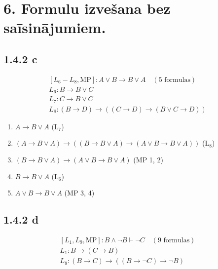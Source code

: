 \documentclass{article}
\begin{document}
\pagebreak
\section*{6. Formulu izvešana bez saīsinājumiem.}

\subsection*{1.4.2 c}

\[
    \begin{array}{l}
        [L_6 - L_8, \text{MP}]: A \lor B \rightarrow B \lor A \quad (5 \text{ formulas}) \\
        L_6: B \rightarrow B \lor C                                                      \\
        L_7: C \rightarrow B \lor C                                                      \\
        L_8: (B \rightarrow D) \rightarrow ((C \rightarrow D) \rightarrow (B \lor C \rightarrow D))
    \end{array}
\]

\begin{enumerate}
    \item $A \rightarrow B \lor A$ \hfill (L$_7$)
    \item $(A \rightarrow B \lor A) \rightarrow ((B \rightarrow B \lor A) \rightarrow (A \lor B \rightarrow B \lor A))$ \hfill (L$_8$)
    \item $(B \rightarrow B \lor A) \rightarrow (A \lor B \rightarrow B \lor A)$ \hfill (MP 1, 2)
    \item $B \rightarrow B \lor A$ \hfill (L$_6$)
    \item $A \lor B \rightarrow B \lor A$ \hfill (MP 3, 4)
\end{enumerate}

\subsection*{1.4.2 d}

\[
    \begin{array}{l}
        [L_1, L_9, \text{MP}]: B \land \neg B \vdash \neg C \quad (9 \text{ formulas}) \\
        L_1: B \rightarrow (C \rightarrow B)                                           \\
        L_9: (B \rightarrow C) \rightarrow ((B \rightarrow \neg C) \rightarrow \neg B)
    \end{array}
\]
\end{document}
